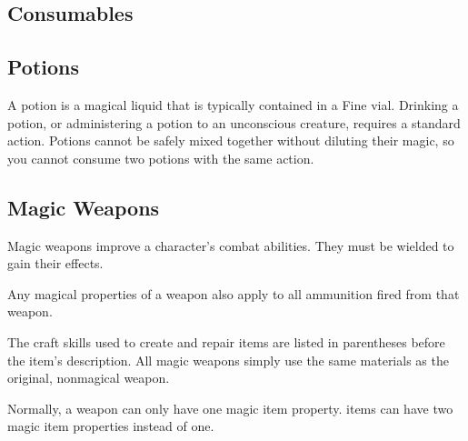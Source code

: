   \begin{longcolumn}
    \section{Consumables}\label{Consumables}

      \subsection{Potions}
        A potion is a magical liquid that is typically contained in a Fine vial.
        Drinking a potion, or administering a potion to an unconscious creature, requires a standard action.
        Potions cannot be safely mixed together without diluting their magic, so you cannot consume two potions with the same action.

        
  \end{longcolumn}

  

\begin{longcolumn}
    \section{Magic Weapons}\label{Magic Weapons}
    \begin{longtablepreface}

      Magic weapons improve a character's combat abilities.
      They must be wielded to gain their effects.

       Any magical properties of a  weapon also apply to all ammunition fired from that weapon.

       The craft skills used to create and repair items are listed in parentheses before the item's description.
      All magic weapons simply use the same materials as the original, nonmagical weapon.

       Normally, a weapon can only have one magic item property.
       items can have two magic item properties instead of one.
    \end{longtablepreface}

    

\end{longcolumn}

